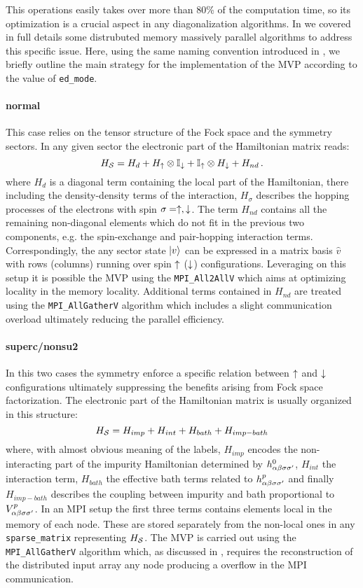 \documentclass[edipack2.tex]{subfiles}
\begin{document}
This operations easily takes over more than 80\% of the computation
time, so its optimization is a crucial aspect in any diagonalization
algorithms. In  we covered in full details
some distrubuted memory massively parallel algorithms to address this
specific issue.
Here, using the same naming convention introduced in \cite{amaricci}, 
we briefly outline the main strategy for the implementation of the MVP
according to the value of {\tt ed\_mode}.


\paragraph{{\bf normal}}
This case relies on the tensor structure of the Fock space and the
symmetry sectors. In any given sector the electronic part of the
Hamiltonian matrix reads:
\begin{equation}
H_{\cal S} = H_d  + H_\uparrow\otimes \mathbb{I}_\downarrow + \mathbb{I}_\uparrow\otimes
H_\downarrow + H_{nd}\,.
\label{HssNormal}
\end{equation}
where $H_d$ is a diagonal term containing the local part of the
Hamiltonian, there including the density-density terms of the
interaction,  $H_\sigma$ describes the hopping processes of the
electrons with spin $\sigma=\uparrow,\downarrow$.
The term $H_{nd}$ contains all the remaining non-diagonal
elements which do not fit in the previous two components,
e.g. the spin-exchange and pair-hopping interaction terms.
Correspondingly, the any sector state $|v\rangle$ can be expressed in a matrix
basis $\hat{v}$ with rows (columns) running over spin $\uparrow$ ($\downarrow$)
configurations. Leveraging on this setup it is possible the MVP using the 
{\tt MPI\_All2AllV} which aims at optimizing locality in the memory
locality. Additional terms contained in $H_{nd}$ are treated using the
{\tt MPI\_AllGatherV} algorithm which includes a slight communication
overload ultimately reducing the parallel efficiency.  


\paragraph{{\bf superc/nonsu2}}
In this two cases the symmetry enforce a specific relation between $\uparrow$ and
$\downarrow$ configurations ultimately suppressing the benefits arising from
Fock space factorization.
The electronic part of the Hamiltonian matrix is usually organized in this structure:
$$
H_{\cal S} = H_{imp} + H_{int} + H_{bath} + H_{imp-bath} 
$$
where, with almost obvious meaning of the labels, $H_{imp}$ encodes
the non-interacting part of the impurity Hamiltonian determined by
$h^0_{\alpha\beta\sigma\sigma'}$, $H_{int}$ the interaction term, $H_{bath}$ the
effective bath terms related to $h^p_{\alpha\beta\sigma\sigma'}$ and finally
$H_{imp-bath}$ describes the coupling between impurity and bath
proportional to $V^p_{\alpha\beta\sigma\sigma'}$. 
In an MPI setup the first three terms contains elements local in the
memory of each node. These are stored separately from the non-local
ones in any {\tt sparse\_matrix} representing $H_{\cal S}$. 
The MVP is carried out using the {\tt MPI\_AllGatherV} algorithm
which, as discussed in , requires the
reconstruction of the distributed input array any node producing a
overflow in the MPI communication.  
\end{document}
